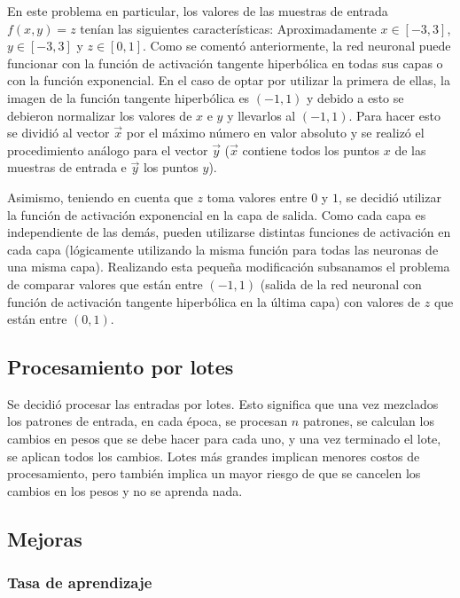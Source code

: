 \documentclass[%
    final,
    reprint,
    notitlepage,
    narroweqnarray,
    inline,
    twoside,
    invited
    ]{ieee}
\begin{document}
\par En este problema en particular, los valores de las muestras de entrada $f(x,y) = z$ tenían las siguientes características: Aproximadamente $x\in [-3,3]$, $y\in [-3,3]$ y $z\in [0,1]$. 
Como se comentó anteriormente, la red neuronal puede funcionar con la función de activación tangente hiperbólica 
en todas sus capas o con la función exponencial. En el caso de optar por utilizar la primera de ellas, la imagen de la 
función tangente hiperbólica es $(-1,1)$ y debido a esto se debieron normalizar los valores de $x$ e $y$ y llevarlos 
al $(-1,1)$. Para hacer esto se dividió al vector  $\vec{x}$ por el máximo número en valor absoluto y se realizó el 
procedimiento análogo para el vector $\vec{y}$ ($\vec{x}$ contiene todos los puntos $x$ de las muestras 
de entrada e $\vec{y}$ los puntos $y$).\\
\par Asimismo, teniendo en cuenta que $z$ toma valores entre $0$ y $1$, se decidió utilizar la función de activación 
exponencial en la capa de salida. Como cada capa es independiente de las demás, pueden utilizarse distintas 
funciones de activación en cada capa (lógicamente utilizando la misma función para todas las neuronas de una misma capa). 
Realizando esta pequeña modificación subsanamos el problema de comparar valores que están entre $(-1,1)$ 
(salida de la red neuronal con función de activación tangente hiperbólica en la última capa) con valores de $z$ que están entre $(0,1)$.

\subsection{Procesamiento por lotes}

\par Se decidió procesar las entradas por lotes. Esto significa que una vez mezclados los patrones de entrada, en cada época, 
se procesan $n$ patrones, se calculan los cambios en pesos que se debe hacer para cada uno, y una vez terminado el lote, 
se aplican todos los cambios. Lotes más grandes implican menores costos de procesamiento, pero también implica un 
mayor riesgo de que se cancelen los cambios en los pesos y no se aprenda nada.

\subsection{Mejoras}

\subsubsection{Tasa de aprendizaje}
\end{document}
